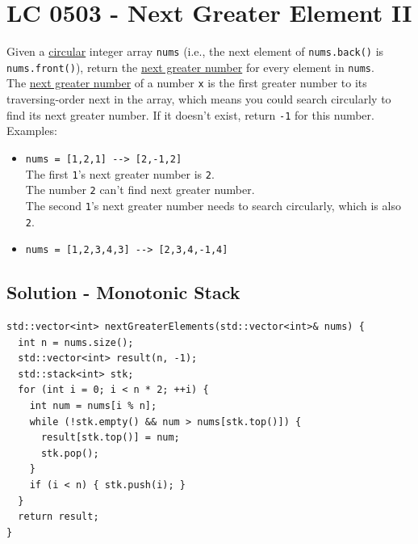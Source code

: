 \section{LC 0503 - Next Greater Element II}
Given a \ul{circular} integer array {\colorbox{CodeBackground}{\lstinline|nums|}} (i.e., the next element of {\colorbox{CodeBackground}{\lstinline|nums.back()|}} is {\colorbox{CodeBackground}{\lstinline|nums.front()|}}), return the \ul{next greater number} for every element in {\colorbox{CodeBackground}{\lstinline|nums|}}.\\

The \ul{next greater number} of a number {\colorbox{CodeBackground}{\lstinline|x|}} is the first greater number to its traversing-order next in the array, which means you could search circularly to find its next greater number. If it doesn't exist, return {\colorbox{CodeBackground}{\lstinline|-1|}} for this number.\\

Examples:
\begin{itemize}
\item {\colorbox{CodeBackground}{\lstinline|nums = [1,2,1] --> [2,-1,2]|}}\\
The first {\colorbox{CodeBackground}{\lstinline|1|}}'s next greater number is {\colorbox{CodeBackground}{\lstinline|2|}}. \\
The number {\colorbox{CodeBackground}{\lstinline|2|}} can't find next greater number. \\
The second {\colorbox{CodeBackground}{\lstinline|1|}}'s next greater number needs to search circularly, which is also {\colorbox{CodeBackground}{\lstinline|2|}}.
\item {\colorbox{CodeBackground}{\lstinline|nums = [1,2,3,4,3] --> [2,3,4,-1,4]|}}
\end{itemize}

\subsection*{Solution - Monotonic Stack}
\begin{lstlisting}
std::vector<int> nextGreaterElements(std::vector<int>& nums) {
  int n = nums.size();
  std::vector<int> result(n, -1);
  std::stack<int> stk;
  for (int i = 0; i < n * 2; ++i) {
    int num = nums[i % n];
    while (!stk.empty() && num > nums[stk.top()]) {
      result[stk.top()] = num;
      stk.pop();
    }
    if (i < n) { stk.push(i); }
  }
  return result;
}
\end{lstlisting}

